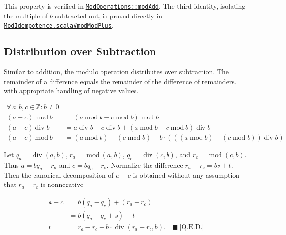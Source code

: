 This property is verified in
\href{https://github.com/thiagomata/prime-numbers/blob/modulo-article-v1.0.0/src/main/scala/v1/chapter2/div/properties/ModOperations.scala#modAdd}{\texttt{ModOperations::modAdd}}.
The third identity, isolating the multiple of $b$ subtracted out, is proved
directly in
\href{https://github.com/thiagomata/prime-numbers/blob/modulo-article-v1.0.0/src/main/scala/v1/chapter2/div/properties/ModIdempotence.scala#modModPlus}{\texttt{ModIdempotence.scala\#modModPlus}}.

\subsection{Distribution over Subtraction}
\label{sec:distribution-subtraction}

Similar to addition, the modulo operation distributes over subtraction. The
remainder of a difference equals the remainder of the difference of
remainders, with appropriate handling of negative values.

\begin{equation*}
\begin{aligned}
\forall\, a, b, c \in \mathbb{Z} : b \neq 0 \\
( a - c ) \operatorname{mod} b
  &= ( a \operatorname{mod} b - c \operatorname{mod} b )
     \operatorname{mod} b \\
( a - c ) \operatorname{div} b
  &= a \operatorname{div} b - c \operatorname{div} b
     + ( a \operatorname{mod} b - c \operatorname{mod} b )
       \operatorname{div} b \\
( a - c ) \operatorname{mod} b
  &= (a \operatorname{mod} b) - (c \operatorname{mod} b)
     - b \cdot (((a \operatorname{mod} b)
     - (c \operatorname{mod} b)) \operatorname{div} b)
\end{aligned}
\end{equation*}

Let $q_a=\operatorname{div}(a,b)$, $r_a=\operatorname{mod}(a,b)$,
$q_c=\operatorname{div}(c,b)$, and $r_c=\operatorname{mod}(c,b)$. Thus
$a=bq_a+r_a$ and $c=bq_c+r_c$. Normalize the difference $r_a-r_c=bs+t$.
Then the canonical decomposition of $a-c$ is obtained without any assumption
that $r_a-r_c$ is nonnegative:

\begin{equation*}
\begin{aligned}
a-c &= b(q_a-q_c)+(r_a-r_c) \\
    &= b(q_a-q_c+s)+t \\
t &= r_a-r_c-b\cdot\operatorname{div}(r_a-r_c,b).
  \quad \blacksquare\ \text{[Q.E.D.]}
\end{aligned}
\end{equation*}

